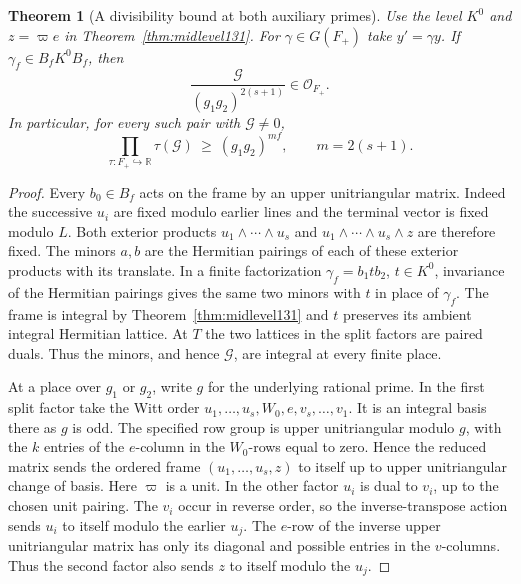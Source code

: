 \documentclass[a4paper,11pt]{article}
\newtheorem{theorem}[proposition]{Theorem}
\theoremstyle{definition}
\theoremstyle{remark}
\numberwithin{equation}{section}
\begin{document}
\begin{theorem}[A divisibility bound at both auxiliary primes]
\label{thm:gap132}
Use the level \(K^0\) and \(z=\varpi e\) in
Theorem~\ref{thm:midlevel131}. For \(\gamma\in G(F_+)\) take
\(y'=\gamma y\). If \(\gamma_f\in B_fK^0B_f\), then
\[
    \frac{\mathcal G}{(g_1g_2)^{2(s+1)}}\in\mathcal O_{F_+}.
\]
In particular, for every such pair with \(\mathcal G\ne0\),
\begin{equation}
     \prod_{\tau:F_+\hookrightarrow\mathbb R}\tau(\mathcal G)
              \ \ge\ (g_1g_2)^{mf},\qquad m=2(s+1).
     \label{eq:gap132}
\end{equation}
\end{theorem}
\begin{proof}
Every \(b_0\in B_f\) acts on the frame by an upper unitriangular
matrix. Indeed the successive \(u_i\) are fixed modulo earlier
lines and the terminal vector is fixed modulo \(L\).
Both exterior products \(u_1\wedge\cdots\wedge u_s\) and
\(u_1\wedge\cdots\wedge u_s\wedge z\) are therefore fixed.
The minors \(a,b\) are the Hermitian pairings of each of these
exterior products with its translate. In a finite factorization
\(\gamma_f=b_1 t b_2\), \(t\in K^0\), invariance of the
Hermitian pairings gives the same two minors with \(t\) in
place of \(\gamma_f\). The frame is integral by
Theorem~\ref{thm:midlevel131} and \(t\) preserves its ambient
integral Hermitian lattice. At \(T\) the two lattices in the
split factors are paired duals. Thus the minors, and hence
\(\mathcal G\), are integral at every finite place.

At a place over \(g_1\) or \(g_2\), write \(g\) for the
underlying rational prime. In the first split factor take the
Witt order \(u_1,\ldots,u_s,W_0,e,v_s,\ldots,v_1\). It is an
integral basis there as \(g\) is odd. The specified row group is
upper unitriangular modulo \(g\), with the \(k\) entries of the
\(e\)-column in the \(W_0\)-rows equal to zero. Hence the
reduced matrix sends the ordered frame \((u_1,\ldots,u_s,z)\)
to itself up to upper unitriangular change of basis. Here
\(\varpi\) is a unit. In the other factor \(u_i\) is dual to
\(v_i\), up to the chosen unit pairing. The \(v_i\) occur
in reverse order, so the inverse-transpose action sends
\(u_i\) to itself modulo the earlier \(u_j\). The \(e\)-row
of the inverse upper unitriangular matrix has only its diagonal
and possible entries in the \(v\)-columns. Thus the second
factor also sends \(z\) to itself modulo the \(u_j\).


\end{proof}
\end{document}
